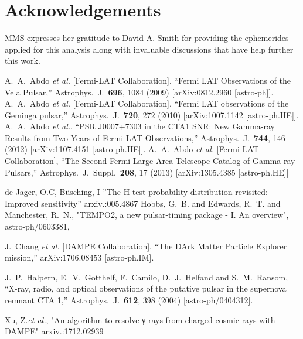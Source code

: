 \documentclass{PoS}
\begin{document}
\section{Acknowledgements}
MMS expresses her gratitude to David A. Smith for providing the ephemerides applied for this analysis along with invaluable discussions that have help further this work.



\begin{thebibliography}{99}

  A.~A.~Abdo {\it et al.} [Fermi-LAT Collaboration],
  ``Fermi LAT Observations of the Vela Pulsar,''
  Astrophys.\ J.\  {\bf 696}, 1084 (2009)
  [arXiv:0812.2960 [astro-ph]].
  A.~A.~Abdo {\it et al.} [Fermi-LAT Collaboration],
  ``Fermi LAT observations of the Geminga pulsar,''
  Astrophys.\ J.\  {\bf 720}, 272 (2010)
  [arXiv:1007.1142 [astro-ph.HE]].
  A.~A.~Abdo {\it et al.},
  ``PSR J0007+7303 in the CTA1 SNR: New Gamma-ray Results from Two Years of Fermi-LAT Observations,''
  Astrophys.\ J.\  {\bf 744}, 146 (2012)
  [arXiv:1107.4151 [astro-ph.HE]].
  A.~A.~Abdo {\it et al.} [Fermi-LAT Collaboration],
  ``The Second Fermi Large Area Telescope Catalog of Gamma-ray Pulsars,''
  Astrophys.\ J.\ Suppl.\  {\bf 208}, 17 (2013)
  [arXiv:1305.4385 [astro-ph.HE]]
  
de Jager, O.C, Büsching, I
''The H-test probability distribution revisited: Improved sensitivity''
    arxiv.:005.4867
{{Hobbs}, G.~B. and {Edwards}, R.~T. and {Manchester}, R.~N.},
"{TEMPO2, a new pulsar-timing package - I. An overview}",
{astro-ph/0603381},

  J.~Chang {\it et al.} [DAMPE Collaboration],
  ``The DArk Matter Particle Explorer mission,''
  arXiv:1706.08453 [astro-ph.IM].

J.~P.~Halpern, E.~V.~Gotthelf, F.~Camilo, D.~J.~Helfand and S.~M.~Ransom,
 ``X-ray, radio, and optical observations of the putative pulsar in the supernova remnant CTA 1,''
  Astrophys.\ J.\  {\bf 612}, 398 (2004)
  [astro-ph/0404312].
  
Xu, Z.{\it et al.},
"An algorithm to resolve γ-rays from charged cosmic rays with DAMPE"
arxiv.:1712.02939

  
\end{thebibliography}
\end{document}
